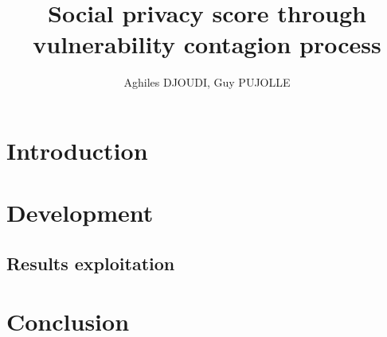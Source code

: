 \documentclass[8pt]{beamer}
\begin{document}
\title{Social privacy score through vulnerability contagion process}
\author{Aghiles DJOUDI, Guy PUJOLLE}

\firstpage

\section{Introduction}
	
	
	
	
	

\tableofcontent

\section{Development}
		
		
		
		
		
		
	\subsection{Results exploitation}
		
		
		
\section{Conclusion}
	


\frameBibliography
\end{document}
